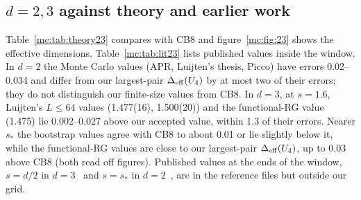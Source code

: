 \subsection{\texorpdfstring{$d=2,3$ against theory and earlier work}{d=2,3 against theory and earlier work}}
Table~\ref{mc:tab:theory23} compares with CB8 and figure~\ref{mc:fig:23} shows the effective dimensions. Table~\ref{mc:tab:lit23} lists published values
inside the window. In $d=2$ the Monte Carlo values (APR, Luijten's thesis, Picco) have errors 0.02--0.034 and differ from our largest-pair
$\Delta_{\rm eff}(U_4)$ by at most two of their errors; they do not distinguish our finite-size values from CB8. In $d=3$, at $s=1.6$, Luijten's
$L\le64$ values (1.477(16), 1.500(20)) and the functional-RG value (1.475) lie 0.002--0.027 above our accepted value, within 1.3 of their
errors. Nearer $s_*$ the bootstrap values agree with CB8 to about 0.01 or lie slightly below it, while the functional-RG values are close to
our largest-pair $\Delta_{\rm eff}(U_4)$, up to 0.03 above CB8 (both read off figures). Published values at the ends of the window, $s=d/2$ in
$d=3$~\cite{mc:Luijten:1997cl} and $s=s_*$ in $d=2$~\cite{mc:Xiao:2025sk}, are in the reference files but outside our grid.
